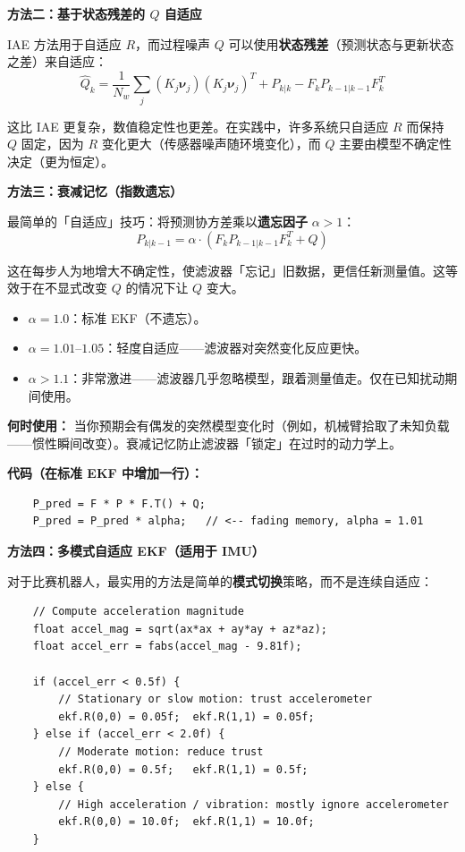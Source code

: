 \textbf{方法二：基于状态残差的 $Q$ 自适应}

IAE 方法用于自适应 $R$，而过程噪声 $Q$ 可以使用\textbf{状态残差}（预测状态与更新状态之差）来自适应：
\begin{equation}
\hat{Q}_k = \frac{1}{N_w} \sum_{j} (K_j \boldsymbol{\nu}_j)(K_j \boldsymbol{\nu}_j)^T + P_{k|k} - F_k P_{k-1|k-1} F_k^T
\end{equation}

这比 IAE 更复杂，数值稳定性也更差。在实践中，许多系统只自适应 $R$ 而保持 $Q$ 固定，因为 $R$ 变化更大（传感器噪声随环境变化），而 $Q$ 主要由模型不确定性决定（更为恒定）。

\textbf{方法三：衰减记忆（指数遗忘）}

最简单的「自适应」技巧：将预测协方差乘以\textbf{遗忘因子} $\alpha > 1$：
\begin{equation}
P_{k|k-1} = \alpha \cdot (F_k P_{k-1|k-1} F_k^T + Q)
\end{equation}

这在每步人为地增大不确定性，使滤波器「忘记」旧数据，更信任新测量值。这等效于在不显式改变 $Q$ 的情况下让 $Q$ 变大。

\begin{itemize}
    \item $\alpha = 1.0$：标准 EKF（不遗忘）。
    \item $\alpha = 1.01$--$1.05$：轻度自适应——滤波器对突然变化反应更快。
    \item $\alpha > 1.1$：非常激进——滤波器几乎忽略模型，跟着测量值走。仅在已知扰动期间使用。
\end{itemize}

\textbf{何时使用：} 当你预期会有偶发的突然模型变化时（例如，机械臂拾取了未知负载——惯性瞬间改变）。衰减记忆防止滤波器「锁定」在过时的动力学上。

\textbf{代码（在标准 EKF 中增加一行）：}
\begin{verbatim}
    P_pred = F * P * F.T() + Q;
    P_pred = P_pred * alpha;   // <-- fading memory, alpha = 1.01
\end{verbatim}

\textbf{方法四：多模式自适应 EKF（适用于 IMU）}

对于比赛机器人，最实用的方法是简单的\textbf{模式切换}策略，而不是连续自适应：

\begin{verbatim}
    // Compute acceleration magnitude
    float accel_mag = sqrt(ax*ax + ay*ay + az*az);
    float accel_err = fabs(accel_mag - 9.81f);

    if (accel_err < 0.5f) {
        // Stationary or slow motion: trust accelerometer
        ekf.R(0,0) = 0.05f;  ekf.R(1,1) = 0.05f;
    } else if (accel_err < 2.0f) {
        // Moderate motion: reduce trust
        ekf.R(0,0) = 0.5f;   ekf.R(1,1) = 0.5f;
    } else {
        // High acceleration / vibration: mostly ignore accelerometer
        ekf.R(0,0) = 10.0f;  ekf.R(1,1) = 10.0f;
    }
\end{verbatim}


